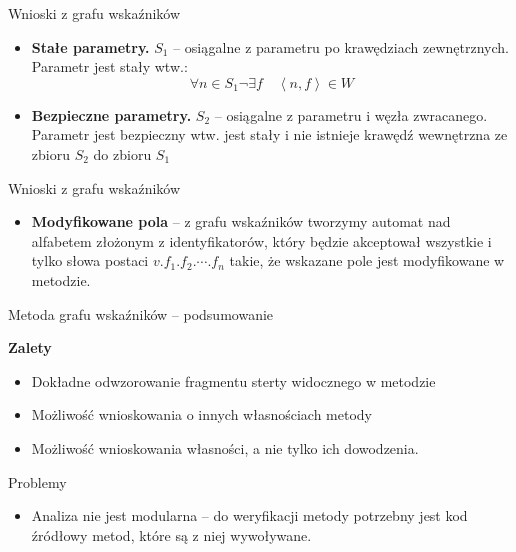 \documentclass[handout]{beamer}
\begin{document}
\begin{frame}{Wnioski z grafu wskaźników}
  \begin{itemize}
    \item \textbf{Stałe parametry.}  $S_1$ -- osiągalne z parametru po
      krawędziach zewnętrznych. Parametr jest stały wtw.:
      $$\forall n \in S_1 \neg\exists f \quad \left<n,f\right>\in W$$
    \item \textbf{Bezpieczne parametry.} $S_2$ -- osiągalne z
      parametru i węzła zwracanego. Parametr jest bezpieczny wtw. jest
      stały i nie istnieje krawędź wewnętrzna ze zbioru $S_2$ do
      zbioru $S_1$
  \end{itemize}
\end{frame}

\begin{frame}{Wnioski z grafu wskaźników}
  \begin{itemize}
    \item \textbf{Modyfikowane pola} -- z grafu wskaźników tworzymy
      automat nad alfabetem złożonym z identyfikatorów, który będzie
      akceptował wszystkie i tylko słowa postaci $v.f_1.f_2.\cdots.f_n$
      takie, że wskazane pole jest modyfikowane w metodzie. 
  \end{itemize}
\end{frame}

\begin{frame}{Metoda grafu wskaźników -- podsumowanie}
  \begin{beamerboxesrounded}[upper=gr, lower=lgr, shadow=true]{\bf Zalety}
    \begin{itemize}
    \item Dokładne odwzorowanie fragmentu sterty widocznego w metodzie
    \item Możliwość wnioskowania o innych własnościach metody
    \item Możliwość wnioskowania własności, a nie tylko ich dowodzenia. 
    \end{itemize}
  \end{beamerboxesrounded}
  \pause
  \begin{alertblock}{Problemy}
    \begin{itemize}
    \item Analiza nie jest modularna -- do weryfikacji metody
      potrzebny jest kod źródłowy metod, które są z niej wywoływane.
    \end{itemize}
  \end{alertblock}
\end{frame}
\end{document}
